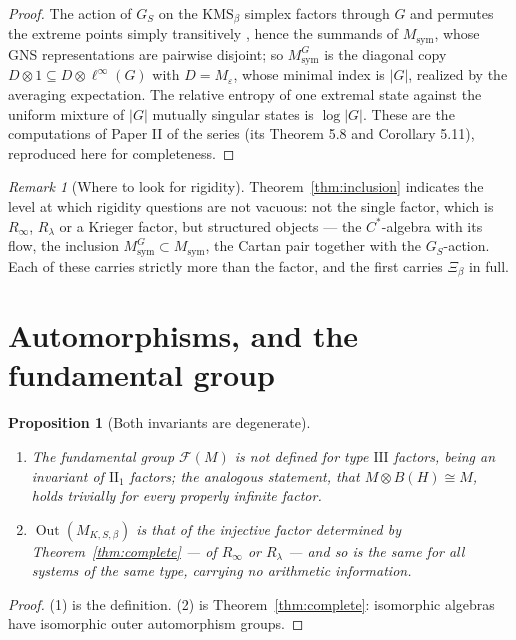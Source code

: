\documentclass[11pt]{amsart}
\numberwithin{equation}{section}
\newtheorem{proposition}[theorem]{Proposition}
\theoremstyle{definition}
\theoremstyle{remark}
\newtheorem{remark}[theorem]{Remark}
\newcommand{\cF}{\mathcal{F}}
\newcommand{\Out}{\operatorname{Out}}
\newcommand{\Msym}{M_{\mathrm{sym}}}
\begin{document}
\begin{proof}
The action of $G_S$ on the $\mathrm{KMS}_\beta$ simplex factors through $G$ and permutes the
extreme points simply transitively \cite[Thm.~3.6(3)]{Main}, hence the summands of $\Msym$,
whose GNS representations are pairwise disjoint; so $\Msym^G$ is the diagonal copy
$D\otimes1\subseteq D\otimes\ell^\infty(G)$ with $D=M_\varepsilon$, whose minimal index is
$|G|$, realized by the averaging expectation. The relative entropy of one extremal state
against the uniform mixture of $|G|$ mutually singular states is $\log|G|$. These are the
computations of Paper II of the series (its Theorem 5.8 and Corollary 5.11), reproduced
here for completeness.
\end{proof}

\begin{remark}[Where to look for rigidity]\label{rem:whererigidity}
Theorem~\ref{thm:inclusion} indicates the level at which rigidity questions are not
vacuous: not the single factor, which is $R_\infty$, $R_\lambda$ or a Krieger factor, but
structured objects --- the $C^*$-algebra with its flow, the inclusion $\Msym^G\subset\Msym$,
the Cartan pair together with the $G_S$-action. Each of these carries strictly more than the factor, and the
first carries $\Xi_\beta$ in full.
\end{remark}

\section{Automorphisms, and the fundamental group}

\begin{proposition}[Both invariants are degenerate]\label{prop:degenerate}
\begin{enumerate}
\item The fundamental group $\cF(M)$ is not defined for type $\mathrm{III}$ factors, being an
invariant of $\mathrm{II}_1$ factors; the analogous statement, that $M\otimes B(H)\cong M$,
holds trivially for every properly infinite factor.
\item $\Out(M_{K,S,\beta})$ is that of the injective factor determined by
Theorem~\ref{thm:complete} --- of $R_\infty$ or $R_\lambda$ --- and so is the same for all
systems of the same type, carrying no arithmetic information.
\end{enumerate}
\end{proposition}

\begin{proof}
(1) is the definition. (2) is Theorem~\ref{thm:complete}: isomorphic algebras have isomorphic
outer automorphism groups.
\end{proof}
\end{document}
